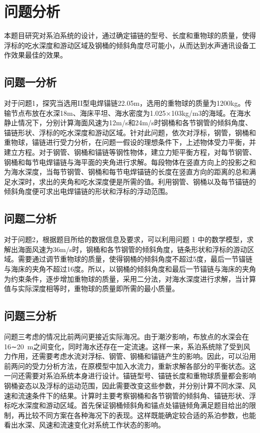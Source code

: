 \section{问题分析}

本题目研究对系泊系统的设计，通过确定锚链的型号、长度和重物球的质量，使得浮标的吃水深度和游动区域及钢桶的倾斜角度尽可能小，从而达到水声通讯设备工作效果最佳的效果。

\subsection{问题一分析}

对于问题1，探究当选用II型电焊锚链22.05m，选用的重物球的质量为1200kg。传输节点布放在水深18m、海床平坦、海水密度为1.025×103kg/m3的海域。在海水静止情况下，分别计算海面风速为12m/s和24m/s时钢桶和各节钢管的倾斜角度、锚链形状、浮标的吃水深度和游动区域。针对此问题，依次对浮标，钢管，钢桶和重物球，锚链进行受力分析，在问题一假设的理想条件下，上述物体受力平衡，并建立方程。对于钢管、钢桶和锚链等钢性物体，建立力矩平衡方程，对每节钢管、钢桶和每节电焊锚链与海平面的夹角进行求解。每段物体在竖直方向上的投影之和为海水深度，当每节钢管、钢桶和每节电焊锚链的长度在竖直方向的距离的总和满足水深时，求出的夹角和吃水深度便是所需的值。利用钢管、钢桶以及每节锚链的倾斜角度便可求出电焊锚链的形状和浮标的浮动范围。

\subsection{问题二分析}

对于问题2，根据题目所给的数据信息及要求，可以利用问题 1 中的数学模型，求解出海面风速为36m/s时，钢桶和各节钢管的倾斜角度，链条形状和浮标的游动区域。需要通过调节重物球的质量，使得钢桶的倾斜角度不超过5度，最后一节锚链与海床的夹角不超过16度。所以，以钢桶的倾斜角度和最后一节锚链与海床的夹角为约束条件，逐步增加重物球的质量，采用二分法，对海水深度进行求解，当计算值与实际深度相等时，重物球的质量即所需的最小质量。

\subsection{问题三分析}

问题三考虑的情况比前两问更接近实际海况。由于潮汐影响，布放点的水深会在16∼20~m之间变化，同时海水还存在一定流速。这样一来，系泊系统除了受到风力作用，还需要考虑水流对浮标、钢管、钢桶和锚链产生的影响。因此，可以沿用前两问的受力分析方法，在原模型中加入水流力，重新求解各部分的平衡状态。这一问还需要对系泊系统本身进行设计。锚链型号、锚链长度和重物球质量都会影响钢桶姿态以及浮标的运动范围，因此需要改变这些参数，并分别计算不同水深、风速和流速条件下的结果。计算时主要考察钢桶和各节钢管的倾斜角、锚链形状、浮标吃水深度和游动区域。首先保证钢桶倾斜角和锚点处锚链倾角满足题目给出的限制，再比较不同方案在各种海况下的表现。这样既能确定较合适的系泊参数，也能看出水深、风速和流速变化对系统工作状态的影响。
